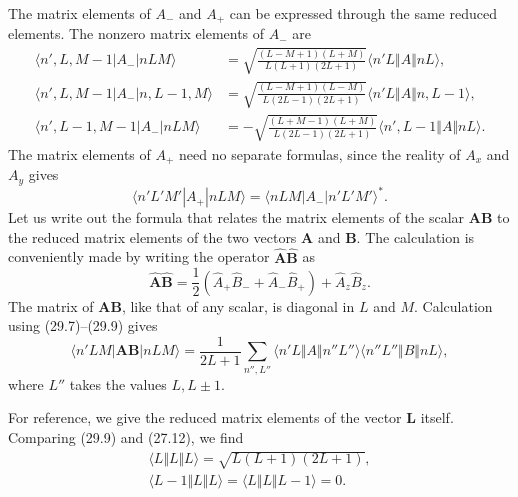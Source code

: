 The matrix elements of $A_-$ and $A_+$ can be expressed through the same
reduced elements. The nonzero matrix elements of $A_-$ are
\begin{equation}
 \begin{aligned}
 \langle n',L,M-1|A_-|nLM\rangle
 &=\sqrt{\frac{(L-M+1)(L+M)}{L(L+1)(2L+1)}}
   \langle n'L\Vert A\Vert nL\rangle,\\
 \langle n',L,M-1|A_-|n,L-1,M\rangle
 &=\sqrt{\frac{(L-M+1)(L-M)}{L(2L-1)(2L+1)}}
   \langle n'L\Vert A\Vert n,L-1\rangle,\\
 \langle n',L-1,M-1|A_-|nLM\rangle
 &=-\sqrt{\frac{(L+M-1)(L+M)}{L(2L-1)(2L+1)}}
   \langle n',L-1\Vert A\Vert nL\rangle.
 \end{aligned}
 \tag{29.9}
\end{equation}
The matrix elements of $A_+$ need no separate formulas, since the reality of
$A_x$ and $A_y$ gives
\begin{equation}
 \langle n'L'M'|A_+|nLM\rangle
 =\langle nLM|A_-|n'L'M'\rangle^*.
 \tag{29.10}
\end{equation}
Let us write out the formula that relates the matrix elements of the scalar
$\mathbf{AB}$ to the reduced matrix elements of the two vectors
$\mathbf A$ and $\mathbf B$. The calculation is conveniently made
by writing the operator $\hat{\mathbf A}\hat{\mathbf B}$ as
\begin{equation}
 \hat{\mathbf A}\hat{\mathbf B}
 =\frac12(\hat A_+\hat B_-+\hat A_-\hat B_+)+\hat A_z\hat B_z.
 \tag{29.11}
\end{equation}
The matrix of $\mathbf{AB}$, like that of any scalar, is diagonal in $L$ and
$M$. Calculation using (29.7)--(29.9) gives
\begin{equation}
 \langle n'LM|\mathbf{AB}|nLM\rangle
 =\frac1{2L+1}\sum_{n'',L''}
 \langle n'L\Vert A\Vert n''L''\rangle
 \langle n''L''\Vert B\Vert nL\rangle,
 \tag{29.12}
\end{equation}
where $L''$ takes the values $L,L\pm1$.

For reference, we give the reduced matrix elements of the vector
$\mathbf L$ itself. Comparing (29.9) and (27.12), we find
\begin{equation}
 \begin{gathered}
  \langle L\Vert L\Vert L\rangle=\sqrt{L(L+1)(2L+1)},\\
  \langle L-1\Vert L\Vert L\rangle
  =\langle L\Vert L\Vert L-1\rangle=0.
 \end{gathered}
 \tag{29.13}
\end{equation}


